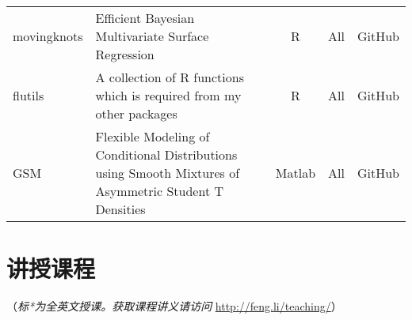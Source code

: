 \documentclass[twoside,a4paper,11pt]{article}
\begin{document}
\begin{tabular}{lp{9cm}ccl}
movingknots & Efficient Bayesian Multivariate Surface Regression                                                                   & R        & All         & GitHub       \\
flutils     & A collection of R functions which is required from my other packages                                                 & R        & All         & GitHub       \\
GSM         & Flexible Modeling of Conditional Distributions using Smooth Mixtures of Asymmetric Student T Densities               & Matlab   & All         & GitHub       \\
  \bottomrule
\end{tabular}


\newpage
\section*{讲授课程}
（\emph{标*为全英文授课。获取课程讲义请访问} \url{http://feng.li/teaching/}）
\end{document}

